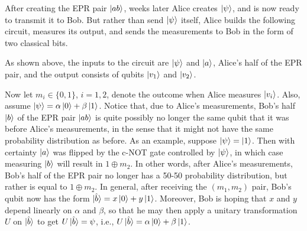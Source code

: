 \documentclass [12pt]{article}
\theoremstyle{definition}
\begin{document}
\newpage
After creating the EPR pair $\ket{ab}$, weeks later Alice creates $\ket{\psi}$, and is now ready to transmit it to Bob. But rather than send $\ket{\psi}$ itself, Alice builds the 
following circuit, measures its output,
and sends the measurements to Bob in the form of two classical bits.

\begin{center}
\end{center}

As shown above, the inputs to the circuit are $\ket{\psi}$ and $\ket{a}$, Alice's half of the EPR pair, and the output consists of qubits $\ket{v_1}$ and $\ket{v_2}$.

Now let $m_i\in\{0,1\}$, $i=1,2$, denote the outcome when Alice measures $\ket{v_i}$. Also, assume $\ket{\psi}=\alpha\ket{0}+\beta\ket{1}$.
Notice that, due to Alice's measurements, Bob's half $\ket{b}$ of the EPR pair $\ket{ab}$ is quite possibly no longer the same qubit that it was before Alice's measurements, in the sense
that it might not have the same probability distribution as before. As an example, suppose $\ket{\psi}=\ket{1}$. Then with certainty $\ket{a}$ was flipped by 
the c-NOT gate controlled by
$\ket{\psi}$, in which case measuring $\ket{b}$ will result in $1\oplus m_2$. In other words, after Alice's measurements, Bob's half of the EPR pair no longer has a 50-50 
probability distribution, but rather is equal to $1\oplus m_2$. In general, after receiving the $(m_1,m_2)$ 
pair, Bob's qubit now has the form $\ket{\hat{b}} = x\ket{0} + y\ket{1}$. Moreover, Bob is hoping that $x$ and $y$ depend linearly on $\alpha$ and $\beta$, so that he may then apply
a unitary transformation $U$ on $\ket{\hat{b}}$ to get $U\ket{\hat{b}}=\psi$, i.e., $U\ket{\hat{b}}=\alpha\ket{0}+\beta\ket{1}$.
\end{document}
